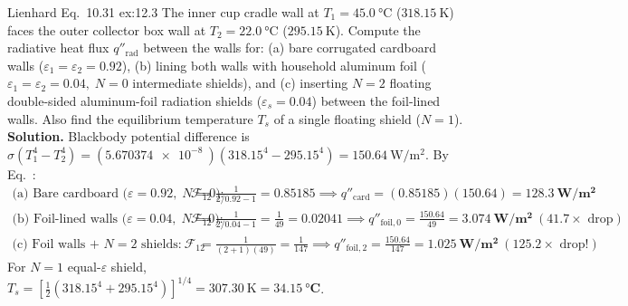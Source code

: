 \begin{workedexample}{Lienhard Eq.\ 10.31 }{ex:12.3}
The inner cup cradle wall at $T_1 = \SI{45.0}{\celsius}$ ($\SI{318.15}{\kelvin}$) faces the outer collector box wall at $T_2 = \SI{22.0}{\celsius}$ ($\SI{295.15}{\kelvin}$). Compute the radiative heat flux $q''_{\mathrm{rad}}$ between the walls for: (a) bare corrugated cardboard walls ($\varepsilon_1 = \varepsilon_2 = 0.92$), (b) lining both walls with household aluminum foil ($\varepsilon_1 = \varepsilon_2 = 0.04,\; N = 0$ intermediate shields), and (c) inserting $N = 2$ floating double-sided aluminum-foil radiation shields ($\varepsilon_s = 0.04$) between the foil-lined walls. Also find the equilibrium temperature $T_s$ of a single floating shield ($N=1$).
\tcblower
\textbf{Solution.} Blackbody potential difference is $\sigma(T_1^4 - T_2^4) = (\SI{5.670374e-8}{})(318.15^4 - 295.15^4) = \SI{150.64}{\watt\per\square\meter}$. By Eq.~:
{\footnotesize\begin{align*}
  \text{(a) Bare cardboard ($\varepsilon=0.92,\; N=0$):}\ \mathcal{F}_{12} &= \frac{1}{2/0.92 - 1} = 0.85185 \implies q''_{\mathrm{card}} = (0.85185)(150.64) = \mathbf{\SI{128.3}{\watt\per\square\meter}} \\
  \text{(b) Foil-lined walls ($\varepsilon=0.04,\; N=0$):}\ \mathcal{F}_{12} &= \frac{1}{2/0.04 - 1} = \frac{1}{49} = 0.02041 \implies q''_{\mathrm{foil},0} = \frac{150.64}{49} = \mathbf{\SI{3.074}{\watt\per\square\meter}}\ (41.7\times\text{ drop}) \\
  \text{(c) Foil walls + $N=2$ shields:}\ \mathcal{F}_{12} &= \frac{1}{(2+1)(49)} = \frac{1}{147} \implies q''_{\mathrm{foil},2} = \frac{150.64}{147} = \mathbf{\SI{1.025}{\watt\per\square\meter}}\ (\mathbf{125.2\times}\text{ drop!})
\end{align*}}
For $N=1$ equal-$\varepsilon$ shield, $T_s = \left[\frac{1}{2}(318.15^4 + 295.15^4)\right]^{1/4} = \SI{307.30}{\kelvin} = \mathbf{\SI{34.15}{\celsius}}$.
\end{workedexample}

